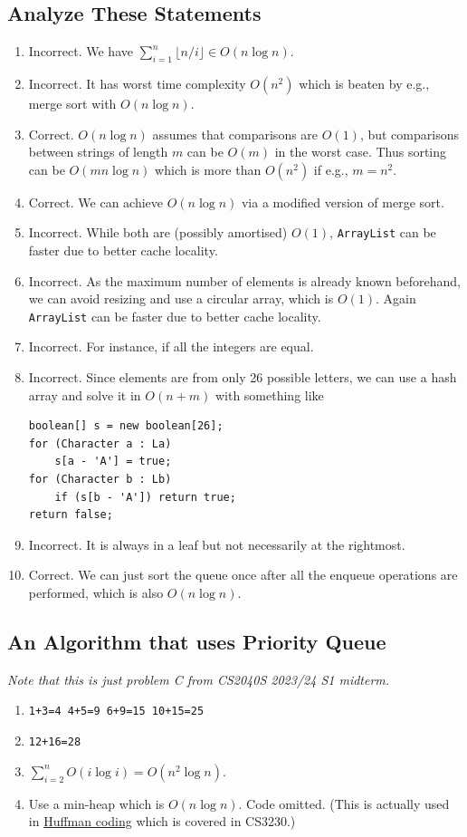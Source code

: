 \documentclass[12pt]{article}
\renewcommand{\t}{\texttt}
\begin{document}
\subsection{Analyze These Statements}
\begin{enumerate}
\item Incorrect. We have $\sum_{i=1}^n\lfloor n/i\rfloor\in O(n\log n)$.
\item Incorrect. It has worst time complexity $O\left(n^2\right)$ which is beaten by e.g., merge sort with $O(n\log n)$.
\item Correct. $O(n\log n)$ assumes that comparisons are $O(1)$, but comparisons between strings of length $m$ can be $O(m)$ in the worst case. Thus sorting can be $O(mn\log n)$ which is more than $O(n^2)$ if e.g., $m=n^2$.
\item Correct. We can achieve $O(n\log n)$ via a modified version of merge sort.
\item Incorrect. While both are (possibly amortised) $O(1)$, \t{ArrayList} can be faster due to better cache locality.
\item Incorrect. As the maximum number of elements is already known beforehand, we can avoid resizing and use a circular array, which is $O(1)$. Again \t{ArrayList} can be faster due to better cache locality.
\item Incorrect. For instance, if all the integers are equal.
\item Incorrect. Since elements are from only 26 possible letters, we can use a hash array and solve it in $O(n+m)$ with something like
\begin{verbatim}
boolean[] s = new boolean[26];
for (Character a : La)
    s[a - 'A'] = true;
for (Character b : Lb)
    if (s[b - 'A']) return true;
return false;
\end{verbatim}
\item Incorrect. It is always in a leaf but not necessarily at the rightmost.
\item Correct. We can just sort the queue once after all the enqueue operations are performed, which is also $O(n\log n)$.
\end{enumerate}
\subsection{An Algorithm that uses Priority Queue}
\textit{Note that this is just problem C from CS2040S 2023/24 S1 midterm.}
\begin{enumerate}
\item \t{1+3=4
4+5=9
6+9=15
10+15=25}
\item \t{12+16=28}
\item $\sum_{i=2}^nO(i\log i)=O\left(n^2\log n\right)$.
\item Use a min-heap which is $O(n\log n)$. Code omitted. (This is actually used in \href{https://en.wikipedia.org/wiki/Huffman_coding}{Huffman coding} which is covered in CS3230.)
\end{enumerate}
\end{document}
